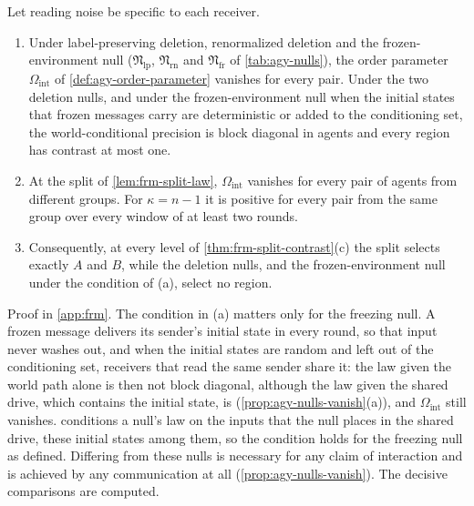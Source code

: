 \begin{proposition}\label{prop:frm-nulls}
Let reading noise be specific to each receiver.
\begin{enumerate}
\item[(a)] Under label-preserving deletion, renormalized deletion and the frozen-environment null ($\mathfrak N_{\mathrm{lp}}$, $\mathfrak N_{\mathrm{rn}}$ and $\mathfrak N_{\mathrm{fr}}$ of \cref{tab:agy-nulls}), the order parameter $\Omega_{\mathrm{int}}$ of \cref{def:agy-order-parameter} vanishes for every pair. Under the two deletion nulls, and under the frozen-environment null when the initial states that frozen messages carry are deterministic or added to the conditioning set, the world-conditional precision is block diagonal in agents and every region has contrast at most one.
\item[(b)] At the split of \cref{lem:frm-split-law}, $\Omega_{\mathrm{int}}$ vanishes for every pair of agents from different groups. For $\kappa=n-1$ it is positive for every pair from the same group over every window of at least two rounds.
\item[(c)] Consequently, at every level of \cref{thm:frm-split-contrast}(c) the split selects exactly $A$ and $B$, while the deletion nulls, and the frozen-environment null under the condition of (a), select no region.
\end{enumerate}
\end{proposition}
Proof in \cref{app:frm}. The condition in (a) matters only for the freezing null. A frozen message delivers its sender's initial state in every round, so that input never washes out, and when the initial states are random and left out of the conditioning set, receivers that read the same sender share it: the law given the world path alone is then not block diagonal, although the law given the shared drive, which contains the initial state, is (\cref{prop:agy-nulls-vanish}(a)), and $\Omega_{\mathrm{int}}$ still vanishes.  conditions a null's law on the inputs that the null places in the shared drive, these initial states among them, so the condition holds for the freezing null as defined. Differing from these nulls is necessary for any claim of interaction and is achieved by any communication at all (\cref{prop:agy-nulls-vanish}). The decisive comparisons are computed.

